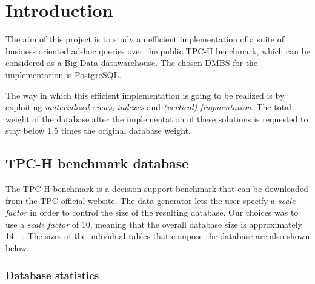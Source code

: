 

\section{Introduction}
\label{section:introduction}

The aim of this project is to study an efficient implementation of a suite of business oriented ad-hoc queries over the public TPC-H benchmark, which can be considered as a Big Data datawarehouse. The chosen DMBS for the implementation is \href{https://www.postgresql.org}{PostgreSQL}.

The way in which this efficient implementation is going to be realized is by exploiting \textit{materialized views}, \textit{indexes} and \textit{(vertical) fragmentation}. The total weight of the database after the implementation of these solutions is requested to stay below \num{1.5} times the original database weight.

\subsection{TPC-H benchmark database}

The TPC-H benchmark is a decision support benchmark that can be downloaded from the \href{https://www.tpc.org/tpch/}{TPC official website}. The data generator lets the user specify a \textit{scale factor} in order to control the size of the resulting database. Our choices was to use a \textit{scale factor} of \num{10}, meaning that the overall database size is approximately \SI{14}{\giga\byte}. The sizes of the individual tables that compose the database are also shown below.

\subsubsection{Database statistics}

